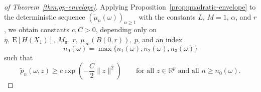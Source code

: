 \documentclass[10pt,a4paper]{amsart}
\begin{document}
\begin{proof}[of Theorem~\ref{thm:gp-envelope}]
Applying Proposition~\ref{prop:quadratic-envelope} to the deterministic
sequence $(\tilde\mu_n(\omega))_{n\ge1}$ with the constants $L$, $M=1$,
$\alpha$, and $r$, we obtain constants $c,C>0$, depending only
on $\bar{\eta},~\mathrm{E}[H(X_{1})],~M_{\pi},~r,~\mu_{\infty}(B(0,r)),~p$,
and an index
\[
n_{0}(\omega)=\max\{n_{1}(\omega),n_{2}(\omega),n_{3}(\omega)\}
\]
such that
\[
\tilde p_{n}(\omega,z)\ge c\exp\left(-\frac{C}{2}\|z\|^{2}\right)\qquad\text{for all }z\in\mathbb{R}^{p}\text{ and all }n\ge n_{0}(\omega).
\]
\end{proof}
\end{document}
